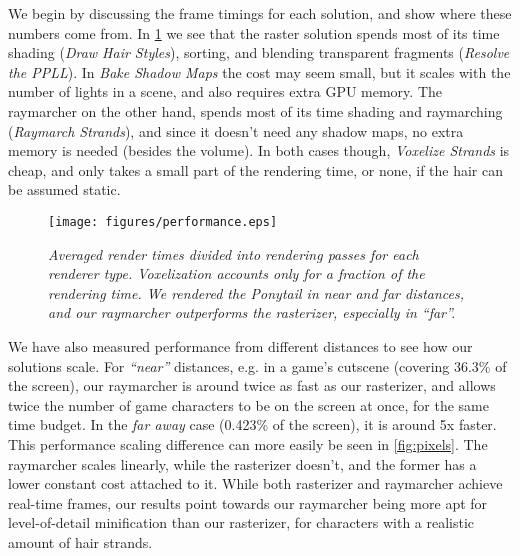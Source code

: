\documentclass{egpubl}
\begin{document}

We begin by discussing the frame timings for each solution, and show where these numbers come from. In \cref{fig:performance} we see that the raster solution spends most of its time shading (\emph{Draw Hair Styles}), sorting, and blending transparent fragments (\emph{Resolve the PPLL}). In \emph{Bake Shadow Maps} the cost may seem small, but it scales with the number of lights in a scene, and also requires extra GPU memory. The raymarcher on the other hand, spends most of its time shading and raymarching (\emph{Raymarch Strands}), and since it doesn't need any shadow maps, no extra memory is needed (besides the volume). In both cases though, \emph{Voxelize Strands} is cheap, and only takes a small part of the rendering time, or none, if the hair can be assumed static.

\begin{figure}[htb]
    \centering
    \texttt{[image: figures/performance.eps]}
    \caption{\emph{Averaged render times divided into rendering passes for each renderer type. Voxelization accounts only for a fraction of the rendering time. We rendered the Ponytail in near and far distances, and our raymarcher outperforms the rasterizer, especially in ``far''.}}
    \label{fig:performance}
    \vspace{-2mm}
\end{figure}


We have also measured performance from different distances to see how our solutions scale. For \emph{``near''} distances, e.g. in a game's cutscene (covering 36.3\% of the screen), our raymarcher is around twice as fast as our rasterizer, and allows twice the number of game characters to be on the screen at once, for the same time budget. In the \emph{far away} case (0.423\% of the screen), it is around 5x faster. This performance scaling difference can more easily be seen in \cref{fig:pixels}. The raymarcher scales linearly, while the rasterizer doesn't, and the former has a lower constant cost attached to it. While both rasterizer and raymarcher achieve real-time frames, our results point towards our raymarcher being more apt for level-of-detail minification than our rasterizer, for characters with a realistic amount of hair strands.
\end{document}
